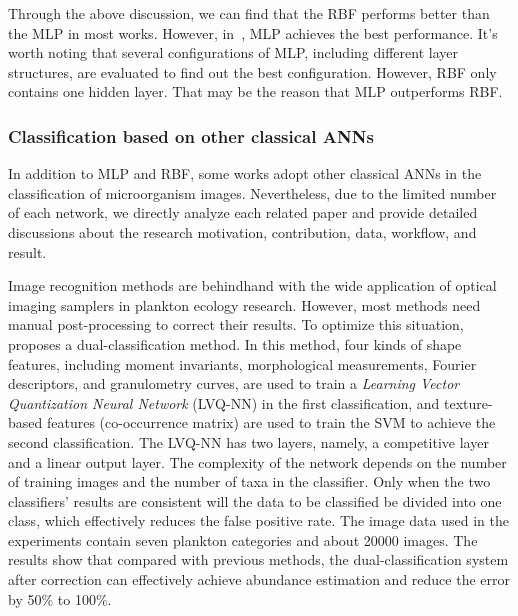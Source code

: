 Through the above discussion, we can find that the RBF performs better than the MLP in most works. However, in~\cite{Kiranyaz-2011-CRMI}, MLP achieves the best performance. It's worth noting that several configurations of MLP, including different layer structures, are evaluated to find out the best configuration. However, RBF only contains one hidden layer. That may be the reason that MLP outperforms RBF.

\subsubsection{Classification based on other classical ANNs}

In addition to MLP and RBF, some works adopt other classical ANNs in the classification of microorganism images. Nevertheless, due to the limited number of each network, we directly analyze each related paper and provide detailed discussions about the research motivation, contribution, data, workflow, and result.

Image recognition methods are behindhand with the wide application of optical imaging samplers in plankton ecology research. However, most methods need manual post-processing to correct their results. To optimize this situation, \cite{Hu-2006-AAQT} proposes a dual-classification method. In this method, four kinds of shape features, including moment invariants, morphological measurements, Fourier descriptors, and granulometry curves, are used to train a \emph{Learning Vector Quantization Neural Network} (LVQ-NN) in the first classification, and texture-based features (co-occurrence matrix) are used to train the SVM to achieve the second classification. The LVQ-NN has two layers, namely, a competitive layer and a linear output layer. The complexity of the network depends on the number of training images and the number of taxa in the classifier. Only when the two classifiers' results are consistent will the data to be classified be divided into one class, which effectively reduces the false positive rate. The image data used in the experiments contain seven plankton categories and about 20000 images. The results show that compared with previous methods, the dual-classification system after correction can effectively achieve abundance estimation and reduce the error by 50\% to 100\%.




